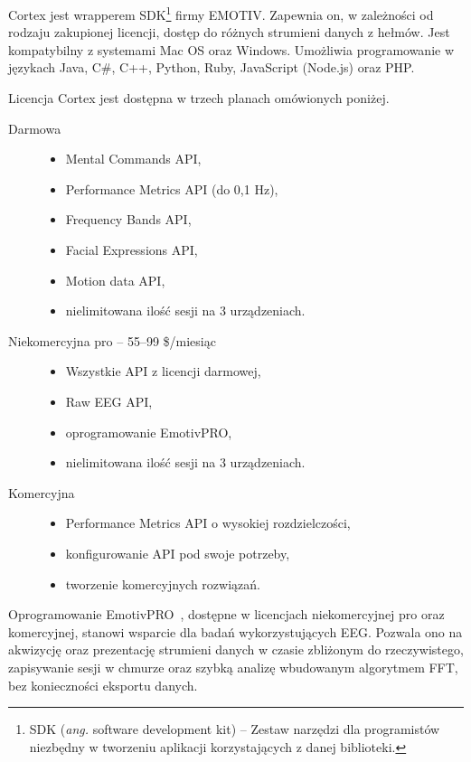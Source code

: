 \documentclass[skorowidz,skroty]{dyplomWEZUT}
\begin{document}
Cortex jest wrapperem SDK\footnote{SDK (\textit{ang.} software development kit) -- Zestaw narzędzi dla programistów niezbędny w tworzeniu aplikacji korzystających z danej biblioteki.\label{foot:sdk}} firmy EMOTIV. Zapewnia on, w zależności od rodzaju zakupionej licencji, dostęp do różnych strumieni danych z hełmów. Jest kompatybilny z systemami Mac OS oraz Windows. Umożliwia programowanie w językach Java, C\#, C++, Python, Ruby, JavaScript (Node.js) oraz PHP.

\pagebreak
Licencja Cortex jest dostępna w trzech planach omówionych poniżej.
\begin{description}
    \item [Darmowa] \hfill
    \begin{itemize}
        \item Mental Commands API,
        \item Performance Metrics API (do 0,1 Hz),
        \item Frequency Bands API,
        \item Facial Expressions API,
        \item Motion data API,
        \item nielimitowana ilość sesji na 3 urządzeniach.
    \end{itemize}
    \item [Niekomercyjna pro -- 55--99 \$/miesiąc] \hfill
    \begin{itemize}
        \item Wszystkie API z licencji darmowej,
        \item Raw EEG API,
        \item oprogramowanie EmotivPRO,
        \item nielimitowana ilość sesji na 3 urządzeniach.
    \end{itemize}
    \item [Komercyjna] \hfill
    \begin{itemize}
        \item Performance Metrics API o wysokiej rozdzielczości,
        \item konfigurowanie API pod swoje potrzeby,
        \item tworzenie komercyjnych rozwiązań.
    \end{itemize}
\end{description}

Oprogramowanie EmotivPRO~\cite{emotiv_pro}, dostępne w licencjach niekomercyjnej pro oraz komercyjnej, stanowi wsparcie dla badań wykorzystujących EEG. Pozwala ono na akwizycję oraz prezentację strumieni danych w czasie zbliżonym do rzeczywistego, zapisywanie sesji w chmurze oraz szybką analizę wbudowanym algorytmem FFT, bez konieczności eksportu danych.
\end{document}
